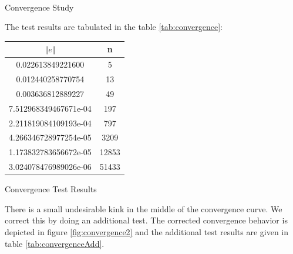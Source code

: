 \documentclass[a4paper,12pt]{article}
\makeatletter
\newenvironment{tablehere}
  {\def\@captype{table}}
  {}
\newenvironment{figurehere}
  {\def\@captype{figure}}
  {}
\makeatother
\begin{document}
\begin{center}
\begin{figurehere} 
\\
\caption{Convergence Study}\label{fig:convergence}
\end{figurehere}
\end{center}
The test results are tabulated in the table \ref{tab:convergence}:
\begin{center}
\begin{tablehere}
\begin{tabular}{cc}
 $\Vert e \Vert$ & n \\
\hline
\hline
0.022613849221600 & 5 \\
0.012440258770754 & 13 \\
0.003636812889227 & 49\\
7.512968349467671e-04 & 197\\
2.211819084109193e-04 &  797\\
4.266346728977254e-05 & 3209\\
1.173832783656672e-05 & 12853\\
3.024078476989026e-06 & 51433\\
\end{tabular}
\caption{Convergence Test Results}\label{tab:convergence}
\end{tablehere}
\end{center}
There is a small undesirable kink in the middle of the convergence curve. We correct this by doing an additional test. The corrected convergence behavior is depicted in figure \ref{fig:convergence2} and the additional test results are given in table \ref{tab:convergenceAdd}.
\end{document}
